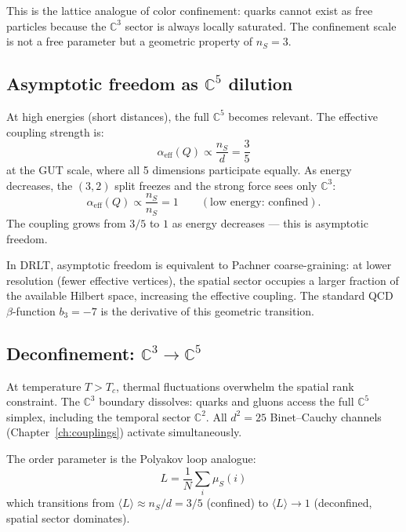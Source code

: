 This is the lattice analogue of color confinement: quarks cannot exist as free particles because the $\mathbb{C}^3$ sector is always locally saturated. The confinement scale is not a free parameter but a geometric property of $n_S = 3$.

\subsection{Asymptotic freedom as $\mathbb{C}^5$ dilution}

At high energies (short distances), the full $\mathbb{C}^5$ becomes relevant. The effective coupling strength is:
\begin{equation}
\alpha_\text{eff}(Q) \propto \frac{n_S}{d} = \frac{3}{5}
\end{equation}
at the GUT scale, where all 5 dimensions participate equally. As energy decreases, the $(3,2)$ split freezes and the strong force sees only $\mathbb{C}^3$:
\begin{equation}
\alpha_\text{eff}(Q) \propto \frac{n_S}{n_S} = 1 \qquad (\text{low energy: confined}).
\end{equation}
The coupling grows from $3/5$ to $1$ as energy decreases --- this is asymptotic freedom.

In DRLT, asymptotic freedom is equivalent to Pachner coarse-graining: at lower resolution (fewer effective vertices), the spatial sector occupies a larger fraction of the available Hilbert space, increasing the effective coupling. The standard QCD $\beta$-function $b_3 = -7$ is the derivative of this geometric transition.

\subsection{Deconfinement: $\mathbb{C}^3 \to \mathbb{C}^5$}

At temperature $T > T_c$, thermal fluctuations overwhelm the spatial rank constraint. The $\mathbb{C}^3$ boundary dissolves: quarks and gluons access the full $\mathbb{C}^5$ simplex, including the temporal sector $\mathbb{C}^2$. All $d^2 = 25$ Binet--Cauchy channels (Chapter~\ref{ch:couplings}) activate simultaneously.

The order parameter is the Polyakov loop analogue:
\begin{equation}
L = \frac{1}{N}\sum_i \mu_S(i)
\end{equation}
which transitions from $\langle L\rangle \approx n_S/d = 3/5$ (confined) to $\langle L\rangle \to 1$ (deconfined, spatial sector dominates).

